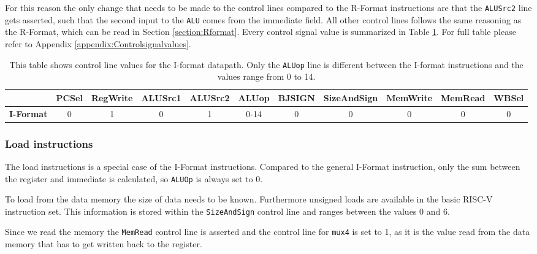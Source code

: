         For this reason the only change that needs to be made to the control lines compared to the R-Format instructions are that the \texttt{ALUSrc2} line gets asserted, such that the second input to the \texttt{ALU} comes from the immediate field. All other control lines follows the same reasoning as the R-Format, which can be read in Section \ref{section:Rformat}. Every control signal value is summarized in Table \ref{table:IFORMAT}. For full table please refer to Appendix \ref{appendix:Controlsignalvalues}.
        
        \begin{table}[h!]
            \small
            \hspace{-2.4cm}
            \begin{tabular}{|c||c|c|c|c|c|c|c|c|c|c|}
            	\hline
            	                  & \textbf{PCSel} & \textbf{RegWrite} & \textbf{ALUSrc1} & \textbf{ALUSrc2} & \textbf{ALUop} & \textbf{BJSIGN} & \textbf{SizeAndSign} & \textbf{MemWrite} & \textbf{MemRead} & \textbf{WBSel} \\ \hline\hline
            	\textbf{I-Format} &       0        &         1         &        0         &        1         &      0-14      &        0        &          0           &         0         &        0         &       0        \\ \hline
            \end{tabular}
            \caption{This table shows control line values for the I-format datapath. Only the \texttt{ALUop} line is different between the I-format instructions and the values range from 0 to 14.}
            \label{table:IFORMAT}
        \end{table}
    
        \subsubsection{Load instructions}
            The load instructions is a special case of the I-Format instructions. Compared to the general I-Format instruction, only the sum between the register and immediate is calculated, so \texttt{ALUOp} is always set to 0.
            
            To load from the data memory the size of data needs to be known. Furthermore unsigned loads are available in the basic RISC-V instruction set. This information is stored within the \texttt{SizeAndSign} control line and ranges between the values 0 and 6.
            
            Since we read the memory the \texttt{MemRead} control line is asserted and the control line for \texttt{mux4} is set to 1, as it is the value read from the data memory that has to get written back to the register.
            
